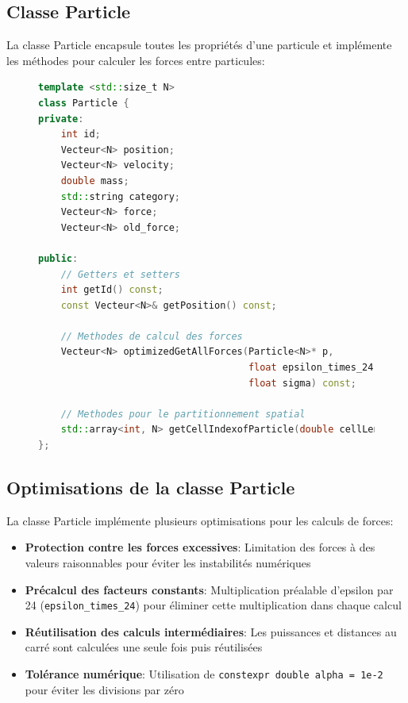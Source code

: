 \documentclass[12pt,a4paper]{article}
\begin{document}
\subsection{Classe Particle}

La classe Particle encapsule toutes les propriétés d'une particule et implémente les méthodes pour calculer les forces entre particules:

\begin{figure}[H]
\begin{lstlisting}[language=C++, caption=Extrait de la classe Particle]
template <std::size_t N>
class Particle {
private:
    int id;
    Vecteur<N> position;
    Vecteur<N> velocity;
    double mass;
    std::string category;
    Vecteur<N> force;
    Vecteur<N> old_force;

public:
    // Getters et setters
    int getId() const;
    const Vecteur<N>& getPosition() const;
    
    // Methodes de calcul des forces
    Vecteur<N> optimizedGetAllForces(Particle<N>* p, 
                                     float epsilon_times_24,
                                     float sigma) const;
    
    // Methodes pour le partitionnement spatial
    std::array<int, N> getCellIndexofParticle(double cellLength) const;
};
\end{lstlisting}
\end{figure}

\subsection{Optimisations de la classe Particle}

La classe Particle implémente plusieurs optimisations pour les calculs de forces:

\begin{itemize}
    \item \textbf{Protection contre les forces excessives}: Limitation des forces à des valeurs raisonnables pour éviter les instabilités numériques
    \item \textbf{Précalcul des facteurs constants}: Multiplication préalable d'epsilon par 24 (\texttt{epsilon\_times\_24}) pour éliminer cette multiplication dans chaque calcul
    \item \textbf{Réutilisation des calculs intermédiaires}: Les puissances et distances au carré sont calculées une seule fois puis réutilisées
    \item \textbf{Tolérance numérique}: Utilisation de \texttt{constexpr double alpha = 1e-2} pour éviter les divisions par zéro
\end{itemize}
\end{document}
